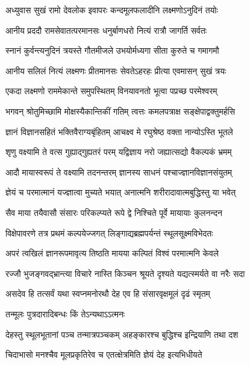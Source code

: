 \twolineshloka
{अध्युवास सुखं रामो देवलोक इवापरः}
{कन्दमूलफलादीनि लक्ष्मणोऽनुदिनं तयोः} %

\twolineshloka
{आनीय प्रददौ रामसेवातत्परमानसः}
{धनुर्बाणधरो नित्यं रात्रौ जागर्ति सर्वतः} %

\twolineshloka
{स्नानं कुर्वन्त्यनुदिनं त्रयस्ते गौतमीजले}
{उभयोर्मध्यगा सीता कुरुते च गमागमौ} %

\twolineshloka
{आनीय सलिलं नित्यं लक्ष्मणः प्रीतमानसः}
{सेवतेऽहरहः प्रीत्या एवमासन् सुखं त्रयः} %

\twolineshloka
{एकदा लक्ष्मणो राममेकान्ते समुपस्थितम्}
{विनयावनतो भूत्वा पप्रच्छ परमेश्वरम्} %

\twolineshloka
{भगवन् श्रोतुमिच्छामि मोक्षस्यैकान्तिकीं गतिम्}
{त्वत्तः कमलपत्राक्ष सङ्क्षेपाद्वक्तुमर्हसि} %

\twolineshloka
{ज्ञानं विज्ञानसहितं भक्तिवैराग्यबृंहितम्}
{आचक्ष्व मे रघुश्रेष्ठ वक्ता नान्योऽस्ति भूतले} %


\twolineshloka
{शृणु वक्ष्यामि ते वत्स गुह्याद्गुह्यतरं परम्}
{यद्विज्ञाय नरो जह्यात्सद्यो वैकल्पकं भ्रमम्} %

\twolineshloka
{आदौ मायास्वरूपं ते वक्ष्यामि तदनन्तरम्}
{ज्ञानस्य साधनं पश्चाज्ज्ञानविज्ञानसंयुतम्} %

\twolineshloka
{ज्ञेयं च परमात्मानं यज्ज्ञात्वा मुच्यते भयात्}
{अनात्मनि शरीरादावात्मबुद्धिस्तु या भवेत्} %

\twolineshloka
{सैव माया तयैवासौ संसारः परिकल्प्यते}
{रूपे द्वे निश्चिते पूर्वे मायायाः कुलनन्दन} %

\twolineshloka
{विक्षेपावरणे तत्र प्रथमं कल्पयेज्जगत्}
{लिङ्गाद्यब्रह्मपर्यन्तं स्थूलसूक्ष्मविभेदतः} %

\twolineshloka
{अपरं त्वखिलं ज्ञानरूपमावृत्य तिष्ठति}
{मायया कल्पितं विश्वं परमात्मनि केवले} %

\twolineshloka
{रज्जौ भुजङ्गवद्भ्रान्त्या विचारे नास्ति किञ्चन}
{श्रूयते दृश्यते यद्यत्स्मर्यते वा नरैः सदा} %

\twolineshloka
{असदेव हि तत्सर्वं यथा स्वप्नमनोरथौ}
{देह एव हि संसारवृक्षमूलं दृढं स्मृतम्} %

\onelineshloka
{तन्मूलः पुत्रदारादिबन्धः किं तेऽन्यथाऽऽत्मनः} %


\twolineshloka
{देहस्तु स्थूलभूतानां पञ्च तन्मात्रपञ्चकम्}
{अहङ्कारश्च बुद्धिश्च इन्द्रियाणि तथा दश} %

\twolineshloka
{चिदाभासो मनश्चैव मूलप्रकृतिरेव च}
{एतत्क्षेत्रमिति ज्ञेयं देह इत्यभिधीयते} %

